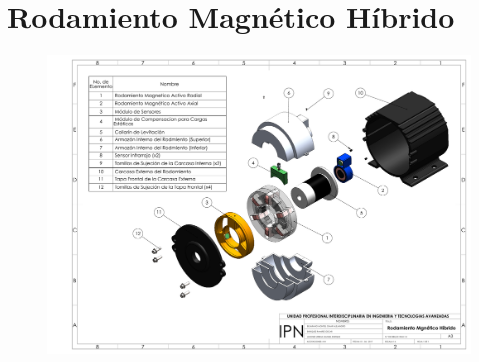 \chapter{Rodamiento Magn\'etico H\'ibrido}

\newpage

\begin{figure}[t]
\centering
	\includegraphics[width=\textheight, height=\textwidth, angle=270]{images/Apendices/Plano_Ensamble}
\end{figure}